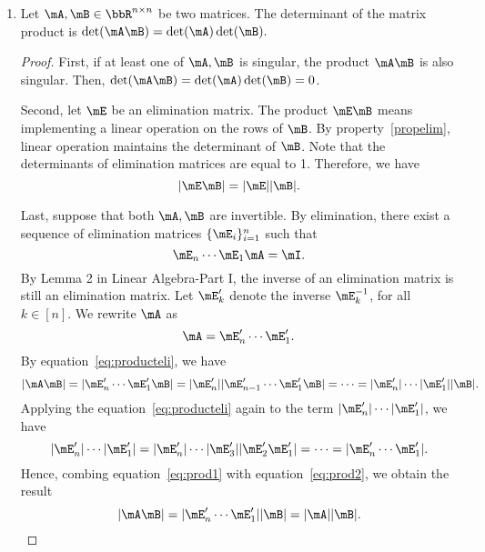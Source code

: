 \documentclass[11pt]{article}
\theoremstyle{plain}
\theoremstyle{definition}
\begin{document}
\begin{enumerate}
\begin{proof}
		($\Leftarrow$) If the determinant $\det(\mA) = 0$, the determinant of $RREF(\mA)$ has the determinant 0. Since the reduced row echelon form  of a matrix contains only distinct nonzero rows, the determinant 0 implies that at least one zero row exists in $RREF(\mA)$. Therefore, the matrix $\mA$ is singular.
	\end{proof}

	
	\item\label{propproduct} Let  $\mA, \mB \in \bbR^{n \times n}$ be two matrices. The determinant of the matrix product is $\det(\mA \mB) = \det(\mA) \det(\mB).$
	
	\begin{proof}
		First, if at least one of $\mA, \mB$ is singular, the product $\mA \mB$ is also singular. Then, $\det(\mA \mB) = \det(\mA) \det(\mB) = 0$. 
		
		Second, let $\mE$ be an elimination matrix. The product $\mE \mB$ means implementing a linear operation on the rows of $\mB$. By property~\ref{propelim}, linear operation maintains the determinant of $\mB$. Note that the determinants of elimination matrices are equal to 1. Therefore, we have
		\begin{equation}\label{eq:producteli}
			|\mE \mB| = |\mE| |\mB|.
		\end{equation}
		
		Last, suppose that both $\mA, \mB$ are invertible. By elimination, there exist a sequence of elimination matrices $\{ \mE_i \}_{i = 1}^n$ such that 
		\[ \mE_n \cdots \mE_1 \mA = \mI.  \]
		By Lemma 2 in Linear Algebra-Part I, the inverse of an elimination matrix is still an elimination matrix. Let $\mE'_k$ denote the inverse $\mE^{-1}_k$, for all $k \in [n]$. We rewrite $\mA$ as
		\[ \mA = \mE'_n \cdots \mE'_1. \]
		By equation~\eqref{eq:producteli}, we have
		\begin{equation}\label{eq:prod1}
			|\mA \mB| = | \mE'_n \cdots \mE'_1 \mB | = |\mE'_n| |\mE'_{n-1} \cdots \mE'_1 \mB| = \cdots = |\mE'_n|\cdots |\mE'_1||\mB|. 
		\end{equation}
		Applying the equation~\eqref{eq:producteli} again to the term $|\mE'_n|\cdots |\mE'_1| $, we have
		\begin{equation}\label{eq:prod2}
			|\mE'_n|\cdots |\mE'_1|  =|\mE'_n|\cdots |\mE'_3| |\mE'_2 \mE'_1| = \cdots = | \mE'_n \cdots \mE'_1|.
		\end{equation}
		Hence, combing equation~\eqref{eq:prod1} with equation~\eqref{eq:prod2}, we obtain the result 
		\[ |\mA \mB|  = | \mE'_n \cdots \mE'_1| |\mB| = |\mA| |\mB|.\]
	\end{proof}
	

\end{enumerate}
\end{document}
